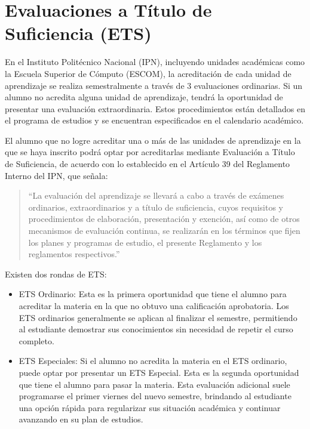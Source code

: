
\section{Evaluaciones a Título de Suficiencia (ETS)}
En el Instituto Politécnico Nacional (IPN), incluyendo unidades académicas como la Escuela Superior de Cómputo (ESCOM), la acreditación de cada unidad de aprendizaje se realiza semestralmente a través de 3 evaluaciones ordinarias. Si un alumno no acredita alguna unidad de aprendizaje, tendrá la oportunidad de presentar una evaluación extraordinaria. Estos procedimientos están detallados en el programa de estudios y se encuentran especificados en el calendario académico.

El alumno que no logre acreditar una o más de las unidades de aprendizaje en la que se haya inscrito podrá optar por acreditarlas mediante Evaluación a Título de Suficiencia, de acuerdo con lo establecido en el Artículo 39 del Reglamento Interno del IPN, que señala: 

\begin{quote}
	``La evaluación del aprendizaje se llevará a cabo a través de exámenes ordinarios, extraordinarios y a título de suficiencia, cuyos requisitos y procedimientos de elaboración, presentación y exención, así como de otros mecanismos de evaluación continua, se realizarán en los términos que fijen los planes y programas de estudio, el presente Reglamento y los reglamentos respectivos.''
\end{quote}

Existen dos rondas de ETS:
\begin{itemize}
	\item ETS Ordinario: Esta es la primera oportunidad que tiene el alumno para acreditar la materia en la que no obtuvo una calificación aprobatoria. Los ETS ordinarios generalmente se aplican al finalizar el semestre, permitiendo al estudiante demostrar sus conocimientos sin necesidad de repetir el curso completo. 
	\item ETS Especiales: Si el alumno no acredita la materia en el ETS ordinario, puede optar por presentar un ETS Especial. Esta es la segunda oportunidad que tiene el alumno para pasar la materia. Esta evaluación adicional suele programarse el primer viernes del nuevo semestre, brindando al estudiante una opción rápida para regularizar sus situación académica y continuar avanzando en su plan de estudios. 
\end{itemize}

